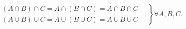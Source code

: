 \documentclass[12pt]{article}
\begin{document}
$$
\left .{\begin{matrix}(A\cap B)\cap C=A\cap (B\cap C)=A\cap B\cap C\quad \\(A\cup B)\cup C=A\cup (B\cup C)=A\cup B\cup C\quad \end{matrix}}\right \}\forall A,B,C.
$$
\end{document}
